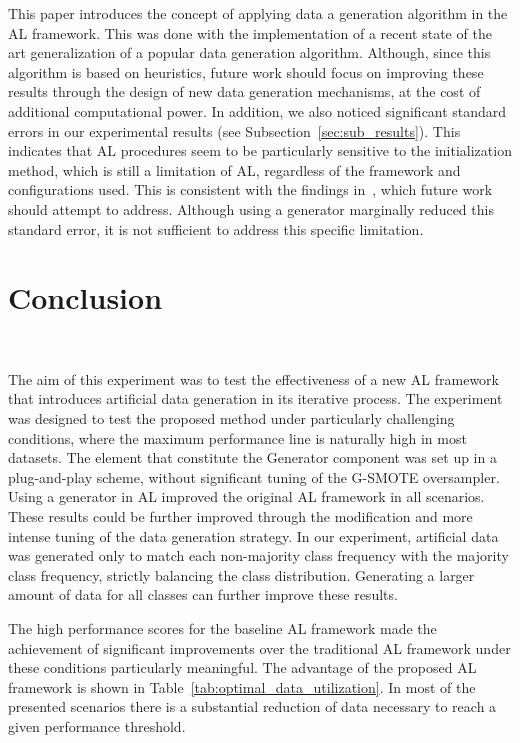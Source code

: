 \documentclass[remotesensing,article,submit,moreauthors,pdftex]{Definitions/mdpi}
\begin{document}
\begin{paracol}{2}
This paper introduces the concept of applying data a generation algorithm in
the AL framework. This was done with the implementation of a recent state of
the art generalization of a popular data generation algorithm. Although, since
this algorithm is based on heuristics, future work should focus on improving
these results through the design of new data generation mechanisms, at the
cost of additional computational power. In addition, we also noticed
significant standard errors in our experimental results
(see Subsection~\ref{sec:sub_results}). This indicates that
AL procedures seem to be particularly sensitive to the initialization method,
which is still a limitation of AL, regardless of the framework and
configurations used. This is consistent with the findings
in~\cite{Kottke2017}, which future work should attempt to address. Although
using a generator marginally reduced this standard error, it is not sufficient
to address this specific limitation.

\section{Conclusion}~\label{sec:conclusion}

The aim of this experiment was to test the effectiveness of a new AL framework
that introduces artificial data generation in its iterative process. The
experiment was designed to test the proposed method under particularly
challenging conditions, where the maximum performance line is naturally high
in most datasets. The element that constitute the Generator component was set
up in a plug-and-play scheme, without significant tuning of the G-SMOTE
oversampler. Using a generator in AL improved the original AL framework in all
scenarios. These results could be further improved through the modification
and more intense tuning of the data generation strategy. In our experiment,
artificial data was generated only to match each non-majority class frequency
with the majority class frequency, strictly balancing the class distribution.
Generating a larger amount of data for all classes can further improve these
results. 

The high performance scores for the baseline AL framework made the achievement
of significant improvements over the traditional AL framework under these
conditions particularly meaningful. The advantage of the proposed AL framework
is shown in Table~\ref{tab:optimal_data_utilization}. In most of the presented
scenarios there is a substantial reduction of data necessary to reach a given
performance threshold. 


\end{paracol}
\end{document}
